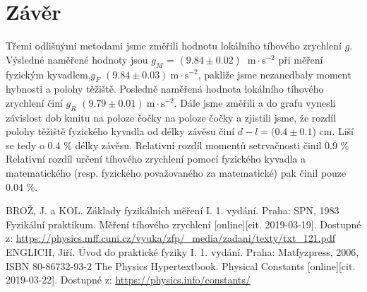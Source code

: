 \documentclass{article}
\begin{document}
\section*{Závěr}
\par Třemi odlišnými metodami jsme změřili hodnotu lokálního tíhového zrychlení $g$. Výsledné naměřené hodnoty jsou $g_{M}$ = $(9.84\pm0.02)\:$ $\mathrm{m \cdot s^{-2}}$ při měření fyzickým kyvadlem,$g_{F}$ $(9.84\pm0.03)\: \mathrm{m \cdot s^{-2}}$, pakliže jsme nezanedbaly moment hybnosti a polohy těžiště. Posledně naměřená hodnota lokálního tíhového zrychlení činí $g_{R}$ $(9.79\pm0.01)\: \mathrm{m \cdot s^{-2}}$. Dále jsme změřili a do grafu vynesli závislost dob kmitu na poloze čočky na poloze čočky a zjistili jsme, že rozdíl polohy těžiště fyzického kyvadla od délky závěsu činí $d-l = (0.4\pm0.1$) cm. Liší se tedy o 0.4 $\%$ délky závěsu. Relativní rozdíl momentů setrvačnosti činil 0.9 $\%$ Relativní rozdíl určení tíhového zrychlení pomocí fyzického kyvadla a matematického (resp. fyzického považovaného za matematické) pak činil pouze 0.04 $\%$.
\renewcommand\refname{Použitá literatura}
\begin{thebibliography}{}
BROŽ, J. a KOL. Základy fyzikálních měření I. 1. vydání. Praha: SPN, 1983
Fyzikální praktikum. Měření tíhového zrychlení [online][cit. 2019-03-19]. Dostupné z:
\url{https://physics.mff.cuni.cz/vyuka/zfp/_media/zadani/texty/txt_121.pdf}
ENGLICH, Jiří. Úvod do praktické fyziky I. 1. vydání. Praha: Matfyzpress, 2006, ISBN 80-86732-93-2
The Physics Hypertextbook. Physical Constants [online][cit. 2019-03-22]. Dostupné z: 
\url{https://physics.info/constants/}
\end{thebibliography}
\end{document}
